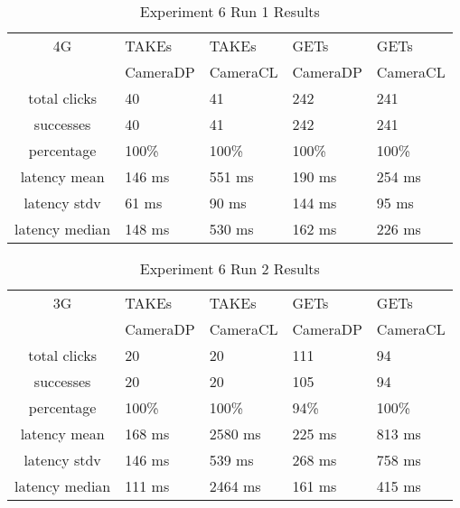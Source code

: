 \begin{table}[htb]
\begin{scriptsize} 
\caption{Experiment 6 Run 1 Results} 
\label{table:exp-6-run1-results}
 \begin{center}
 \begin{tabular}{| c | p{1.5cm} | p{1.5cm} | p{1.5cm} | p{1.4cm} |}
  \hline
  4G & TAKEs & TAKEs & GETs & GETs \\
  & CameraDP & CameraCL & CameraDP & CameraCL \\
  \hline
  total clicks & 40 & 41 & 242 & 241 \\
  \hline
  successes & 40 & 41 & 242 & 241 \\
  \hline
  percentage & 100\% & 100\% & 100\% & 100\% \\
  \hline
  latency mean & 146 ms & 551 ms & 190 ms & 254 ms \\
  \hline
  latency stdv & 61 ms & 90 ms & 144 ms &  95 ms \\
  \hline
  latency median & 148 ms & 530 ms & 162 ms & 226 ms \\
  \hline
  \end{tabular}

  \end{center}
\end{scriptsize}
\end{table}
\begin{table}[htb]
\begin{scriptsize} 
\caption{Experiment 6 Run 2 Results} 
\label{table:exp-6-run2-results}
 \begin{center}
 \begin{tabular}{| c | p{1.5cm} | p{1.5cm} | p{1.5cm} | p{1.4cm} |}
  \hline
  3G & TAKEs & TAKEs & GETs & GETs \\
  & CameraDP & CameraCL & CameraDP & CameraCL \\
  \hline
  total clicks & 20 & 20 & 111 &  94 \\
  \hline
  successes & 20 & 20 & 105 & 94 \\
  \hline
  percentage & 100\% & 100\% & 94\% & 100\% \\
  \hline
  latency mean & 168 ms & 2580 ms & 225 ms & 813 ms \\
  \hline
  latency stdv & 146 ms & 539 ms & 268 ms & 758 ms \\
  \hline
  latency median & 111 ms & 2464 ms & 161 ms & 415 ms \\
  \hline
  \end{tabular}
  \end{center}
\end{scriptsize}
\end{table}
